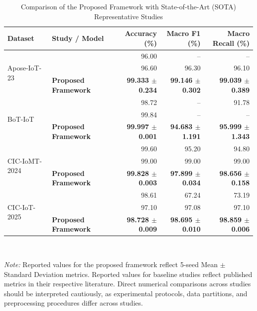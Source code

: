 \documentclass[a4paper,fleqn]{cas-sc}
\begin{document}
\begin{table}[h]
\centering
\caption{Comparison of the Proposed Framework with State-of-the-Art (SOTA) Representative Studies}
\label{tab:sota_comparison}
\begin{tabular}{llrrr}
\toprule
\textbf{Dataset} & \textbf{Study / Model} & \textbf{Accuracy} (\%) & \textbf{Macro F1} (\%) & \textbf{Macro Recall} (\%) \\
\midrule
\multirow{3}{*}{Apose-IoT-23} & \cite{SAHU2021146} & 96.00 & -- & -- \\
 & \cite{patil2025hybrid} & 96.60 & 96.30 & 96.10 \\
 & \textbf{Proposed Framework} & \textbf{99.333 $\pm$ 0.234} & \textbf{99.146 $\pm$ 0.302} & \textbf{99.039 $\pm$ 0.389} \\
\midrule
\multirow{3}{*}{BoT-IoT} & \cite{moustafa2015bot} & 98.72 & -- & 91.78 \\
 & \cite{yan2023deep} & 99.84 & -- & -- \\
 & \textbf{Proposed Framework} & \textbf{99.997 $\pm$ 0.001} & \textbf{94.683 $\pm$ 1.191} & \textbf{95.999 $\pm$ 1.343} \\
\midrule
\multirow{3}{*}{CIC-IoMT-2024} & \cite{iomt2024dataset} & 99.60 & 95.20 & 94.80 \\
 & \cite{shaaban2023biomt} & 99.00 & 99.00 & 99.00 \\
 & \textbf{Proposed Framework} & \textbf{99.828 $\pm$ 0.003} & \textbf{97.899 $\pm$ 0.034} & \textbf{98.656 $\pm$ 0.158} \\
\midrule
\multirow{3}{*}{CIC-IoT-2025} & \cite{ciciot2025dataset} & 98.61 & 67.24 & 73.19 \\
 & \cite{Shibly1813265} & 97.10 & 97.08 & 97.10 \\
 & \textbf{Proposed Framework} & \textbf{98.728 $\pm$ 0.009} & \textbf{98.695 $\pm$ 0.010} & \textbf{98.859 $\pm$ 0.006} \\
\bottomrule
\end{tabular}
\\[1.5ex]
\parbox{\linewidth}{\footnotesize \textit{Note:} Reported values for the proposed framework reflect 5-seed Mean $\pm$ Standard Deviation metrics. Reported values for baseline studies reflect published metrics in their respective literature. Direct numerical comparisons across studies should be interpreted cautiously, as experimental protocols, data partitions, and preprocessing procedures differ across studies.}
\end{table}
\end{document}
